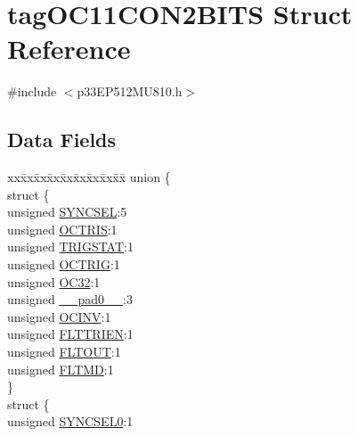 \hypertarget{structtag_o_c11_c_o_n2_b_i_t_s}{}\section{tag\+O\+C11\+C\+O\+N2\+B\+I\+TS Struct Reference}
\label{structtag_o_c11_c_o_n2_b_i_t_s}


{\ttfamily \#include $<$p33\+E\+P512\+M\+U810.\+h$>$}

\subsection*{Data Fields}
\begin{DoxyCompactItemize}
\item 
\begin{tabbing}
xx\=xx\=xx\=xx\=xx\=xx\=xx\=xx\=xx\=\kill
union \{\\
\>struct \{\\
\>\>unsigned \hyperlink{structtag_o_c11_c_o_n2_b_i_t_s_a35fbbe11485c2615ed27535b62c3fa35}{SYNCSEL}:5\\
\>\>unsigned \hyperlink{structtag_o_c11_c_o_n2_b_i_t_s_ab849a74c6179282ed6b06cc047c80544}{OCTRIS}:1\\
\>\>unsigned \hyperlink{structtag_o_c11_c_o_n2_b_i_t_s_ab379549de54ac93ad4aa73686c34cb7c}{TRIGSTAT}:1\\
\>\>unsigned \hyperlink{structtag_o_c11_c_o_n2_b_i_t_s_a8d2cf9b996ef2b9079defa8950de798c}{OCTRIG}:1\\
\>\>unsigned \hyperlink{structtag_o_c11_c_o_n2_b_i_t_s_af52e127483a703e0fa84c7d4f1de0df4}{OC32}:1\\
\>\>unsigned \hyperlink{structtag_o_c11_c_o_n2_b_i_t_s_adf71f3d8410c1f1dbbc96680a92c49af}{\_\_pad0\_\_}:3\\
\>\>unsigned \hyperlink{structtag_o_c11_c_o_n2_b_i_t_s_a301004fca40c8d19d418866c92c19a06}{OCINV}:1\\
\>\>unsigned \hyperlink{structtag_o_c11_c_o_n2_b_i_t_s_ab979b75e02643aa840fb6ee50e0c30fa}{FLTTRIEN}:1\\
\>\>unsigned \hyperlink{structtag_o_c11_c_o_n2_b_i_t_s_ae466664b094d9c830e9ce20b86d7907f}{FLTOUT}:1\\
\>\>unsigned \hyperlink{structtag_o_c11_c_o_n2_b_i_t_s_a245ca3019d6c6ccbfb09f1c821146bb5}{FLTMD}:1\\
\>\} \\
\>struct \{\\
\>\>unsigned \hyperlink{structtag_o_c11_c_o_n2_b_i_t_s_a3b5df3154fde5141e6ac0156425ff8b4}{SYNCSEL0}:1\\

\end{tabbing}
\end{DoxyCompactItemize}

